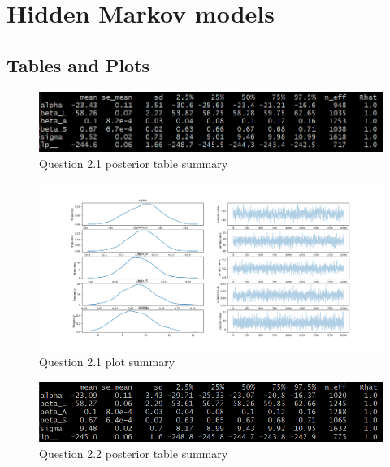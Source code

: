 \documentclass[11pt,a4paper,titlepage]{article}
\begin{document}
\section{Hidden Markov models}

\begin{appendices}
  \section{Tables and Plots}
    \begin{figure}[htb]
      \centering
        \includegraphics[width=\textwidth]{../q21/q21_summary_table.png}
        \caption{Question 2.1 posterior table summary}
      \label{tab:2.1}
    \end{figure}

    \begin{figure}[htb]
      \centering
        \includegraphics[width=\textwidth]{../q21/separated_features.png}
        \caption{Question 2.1 plot summary}
      \label{fig:2.1}
    \end{figure}

    \begin{figure}[htb]
      \centering
        \includegraphics[width=\textwidth]{../q22/q22_table_summary.png}
        \caption{Question 2.2 posterior table summary}
      \label{tab:2.2}
    \end{figure}


\end{appendices}
\end{document}

